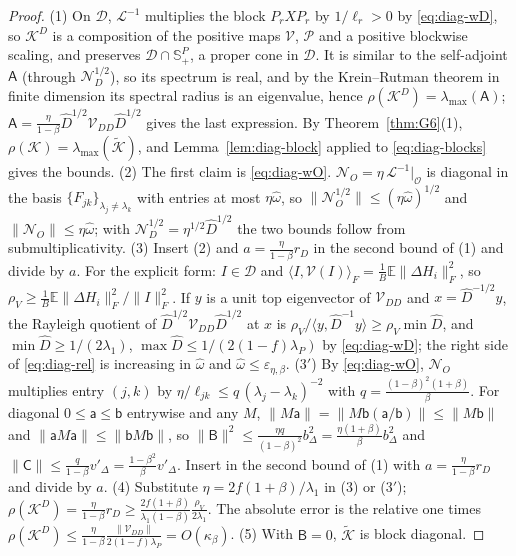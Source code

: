\documentclass[11pt]{article}
\theoremstyle{remark}
\newcommand{\E}{\mathbb{E}}
\begin{document}
\begin{proof}
(1) On $\mathcal D$, $\mathcal L^{-1}$ multiplies the block $P_rXP_r$ by $1/\ell_r>0$ by \eqref{eq:diag-wD}, so $\mathcal K^D$ is a composition of the positive maps $\mathcal V$, $\mathcal P$ and a positive blockwise scaling, and preserves $\mathcal D\cap\mathbb S^P_+$, a proper cone in $\mathcal D$. It is similar to the self-adjoint $\mathsf A$ (through $\mathcal N_D^{1/2}$), so its spectrum is real, and by the Krein--Rutman theorem in finite dimension its spectral radius is an eigenvalue, hence $\rho(\mathcal K^D)=\lambda_{\max}(\mathsf A)$; $\mathsf A=\frac{\eta}{1-\beta}\widehat D^{1/2}\mathcal V_{DD}\widehat D^{1/2}$ gives the last expression. By Theorem~\ref{thm:G6}(1), $\rho(\mathcal K)=\lambda_{\max}(\widetilde{\mathcal K})$, and Lemma~\ref{lem:diag-block} applied to \eqref{eq:diag-blocks} gives the bounds.
(2) The first claim is \eqref{eq:diag-wO}. $\mathcal N_O=\eta\,\mathcal L^{-1}|_{\mathcal O}$ is diagonal in the basis $\{F_{jk}\}_{\lambda_j\ne\lambda_k}$ with entries at most $\eta\widehat\omega$, so $\|\mathcal N_O^{1/2}\|\le(\eta\widehat\omega)^{1/2}$ and $\|\mathcal N_O\|\le\eta\widehat\omega$; with $\mathcal N_D^{1/2}=\eta^{1/2}\widehat D^{1/2}$ the two bounds follow from submultiplicativity.
(3) Insert (2) and $a=\frac{\eta}{1-\beta}r_D$ in the second bound of (1) and divide by $a$. For the explicit form: $I\in\mathcal D$ and $\langle I,\mathcal V(I)\rangle_F=\frac1B\E\|\Delta H_i\|_F^2$, so $\rho_V\ge\frac1B\E\|\Delta H_i\|_F^2/\|I\|_F^2$. If $y$ is a unit top eigenvector of $\mathcal V_{DD}$ and $x=\widehat D^{-1/2}y$, the Rayleigh quotient of $\widehat D^{1/2}\mathcal V_{DD}\widehat D^{1/2}$ at $x$ is $\rho_V/\langle y,\widehat D^{-1}y\rangle\ge\rho_V\min\widehat D$, and $\min\widehat D\ge1/(2\lambda_1)$, $\max\widehat D\le1/(2(1-f)\lambda_P)$ by \eqref{eq:diag-wD}; the right side of \eqref{eq:diag-rel} is increasing in $\widehat\omega$ and $\widehat\omega\le\varepsilon_{\eta,\beta}$.
(3$'$) By \eqref{eq:diag-wO}, $\mathcal N_O$ multiplies entry $(j,k)$ by $\eta/\ell_{jk}\le q\,(\lambda_j-\lambda_k)^{-2}$ with $q=\frac{(1-\beta)^2(1+\beta)}{\beta}$. For diagonal $0\le\mathsf a\le\mathsf b$ entrywise and any $M$, $\|M\mathsf a\|=\|M\mathsf b(\mathsf a/\mathsf b)\|\le\|M\mathsf b\|$ and $\|\mathsf aM\mathsf a\|\le\|\mathsf bM\mathsf b\|$, so $\|\mathsf B\|^2\le\frac{\eta q}{(1-\beta)^2}b_\Delta^2=\frac{\eta(1+\beta)}{\beta}b_\Delta^2$ and $\|\mathsf C\|\le\frac{q}{1-\beta}v'_\Delta=\frac{1-\beta^2}{\beta}v'_\Delta$. Insert in the second bound of (1) with $a=\frac{\eta}{1-\beta}r_D$ and divide by $a$.
(4) Substitute $\eta=2f(1+\beta)/\lambda_1$ in (3) or (3$'$); $\rho(\mathcal K^D)=\frac{\eta}{1-\beta}r_D\ge\frac{2f(1+\beta)}{\lambda_1(1-\beta)}\frac{\rho_V}{2\lambda_1}$. The absolute error is the relative one times $\rho(\mathcal K^D)\le\frac{\eta}{1-\beta}\frac{\|\mathcal V_{DD}\|}{2(1-f)\lambda_P}=O(\kappa_\beta)$.
(5) With $\mathsf B=0$, $\widetilde{\mathcal K}$ is block diagonal.
\end{proof}
\end{document}
